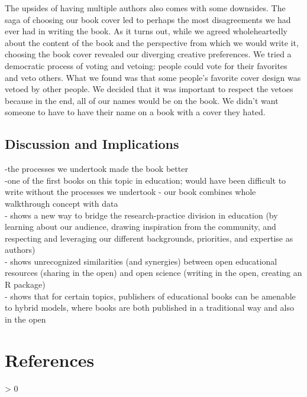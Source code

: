 \documentclass[
  english,
  man]{apa6}
\newlength{\cslhangindent}
\newenvironment{CSLReferences}[2] %
 {%
  \setlength{\parindent}{0pt}
  \ifodd #1 \everypar{\setlength{\hangindent}{\cslhangindent}}\ignorespaces\fi
  \ifnum #2 > 0
  \setlength{\parskip}{#2\baselineskip}
  \fi
 }%
 {}
\begin{document}
The upsides of having multiple authors also comes with some downsides. The saga of choosing our book cover led to perhaps the most disagreements we had ever had in writing the book. As it turns out, while we agreed wholeheartedly about the content of the book and the perspective from which we would write it, choosing the book cover revealed our diverging creative preferences. We tried a democratic process of voting and vetoing: people could vote for their favorites and veto others. What we found was that some people's favorite cover design was vetoed by other people. We decided that it was important to respect the vetoes because in the end, all of our names would be on the book. We didn't want someone to have to have their name on a book with a cover they hated.

\hypertarget{discussion-and-implications}{%
\subsection{Discussion and Implications}\label{discussion-and-implications}}

-the processes we undertook made the book better\\
-one of the first books on this topic in education; would have been difficult to write without the processes we undertook
- our book combines whole walkthrough concept with data\\
- shows a new way to bridge the research-practice division in education (by learning about our audience, drawing inspiration from the community, and respecting and leveraging our different backgrounds, priorities, and expertise as authors)\\
- shows unrecognized similarities (and synergies) between open educational resources (sharing in the open) and open science (writing in the open, creating an R package)\\
- shows that for certain topics, publishers of educational books can be amenable to hybrid models, where books are both published in a traditional way and also in the open

\newpage

\hypertarget{references}{%
\section{References}\label{references}}

\begingroup
\setlength{\parindent}{-0.5in}
\setlength{\leftskip}{0.5in}

\hypertarget{refs}{}
\begin{CSLReferences}{0}{0}
\end{CSLReferences}

\endgroup
\end{document}
